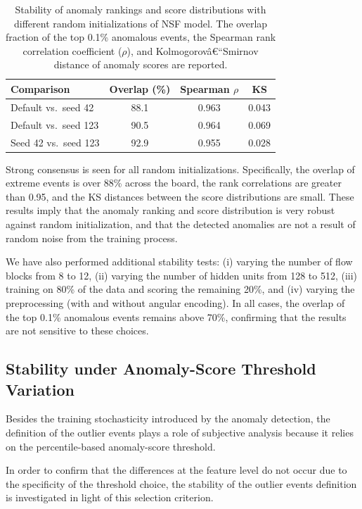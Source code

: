 \documentclass[11pt,a4paper,twocolumn]{article}
\begin{document}
\begin{table}[h]
\centering
\small
\setlength{\tabcolsep}{4pt}
\caption{Stability of anomaly rankings and score distributions with different random initializations of NSF model. The overlap fraction of the top 0.1\% anomalous events, the Spearman rank correlation coefficient ($\rho$), and Kolmogorovâ€“Smirnov distance of anomaly scores are reported.}
\label{tab:seed_stability}
\begin{tabular}{lccc}
\hline
Comparison & Overlap (\%) & Spearman $\rho$ & KS \\
\hline
Default vs.\ seed 42  & 88.1 & 0.963 & 0.043 \\
Default vs.\ seed 123 & 90.5 & 0.964 & 0.069 \\
Seed 42 vs.\ seed 123 & 92.9 & 0.955 & 0.028 \\
\hline
\end{tabular}
\end{table}

Strong consensus is seen for all random initializations. Specifically, the overlap of extreme events is over 88\% across the board, the rank correlations are greater than 0.95, and the KS distances between the score distributions are small. These results imply that the anomaly ranking and score distribution is very robust against random initialization, and that the detected anomalies are not a result of random noise from the training process.

We have also performed additional stability tests: (i) varying the number of flow blocks from 8 to 12, (ii) varying the number of hidden units from 128 to 512, (iii) training on 80\% of the data and scoring the remaining 20\%, and (iv) varying the preprocessing (with and without angular encoding). In all cases, the overlap of the top 0.1\% anomalous events remains above 70\%, confirming that the results are not sensitive to these choices.

\subsection{Stability under Anomaly-Score Threshold Variation}
\label{app:threshold_stability}

Besides the training stochasticity introduced by the anomaly detection, the definition of the outlier events plays a role of subjective analysis because it relies on the percentile-based anomaly-score threshold.

In order to confirm that the differences at the feature level do not occur due to the specificity of the threshold choice, the stability of the outlier events definition is investigated in light of this selection criterion.
\end{document}
